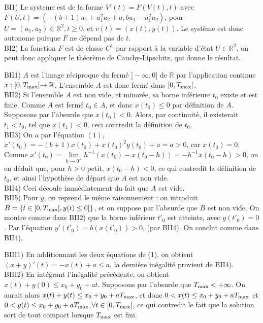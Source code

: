 \documentclass[11pt]{article}
\theoremstyle{exostyle}
\begin{document}
\noindent
BI1) Le systeme est de la forme $V'(t)=F(V(t),t)$ avec $F(U, t)=(-(b+1)u_1+u_1^2u_2+a, bu_1-u_1^2u_2)$, pour $U=(u_1, u_2)\in \mathbb R^2, t \geq 0$, et $v(t)=(x(t), y(t))$.  Le syst\`eme est donc autonome puisque $F$ ne d\'epend pas de $t$. \\
BI2) La fonction $F$ est  de classe $C^1$ par rapport \`a la variable d'\'etat $U\in \mathbb R^2$, on peut donc appliquer le th\'eor\`eme de Cauchy-Lipschitz, qui donne le r\'esultat.

\smallskip
\noindent
BII1)  $A$ est l'image r\'eciproque du ferm\'e   $]-\infty, 0]$ de $\mathbb R$ par l'application continue $x: [0, T_{\rm max}[\to \mathbb R$. L'ensemble $A$ est donc ferm\'e dans $[0, T_{\rm max}[$. \\
BII2) Si l'ensemble $A$ est non vide, et minor\'ee, sa borne inf\'erieure $t_0$ existe et est finie. Comme $A$ est ferm\'e $t_0 \in A$, et donc $x(t_0)\leq 0$ par d\'efinition de $A$. Supposons par l'absurde que $x(t_0)<0$. Alors,  par continuit\'e, il existerait $t_1<t_0$, tel que $x(t_1)<0$. ceci contredit la d\'efinition de $t_0$. \\
BII3) On  a  par l'\'equation $(1)$, $x'(t_0)=-(b+1)x(t_0)+x(t_0)^2 y(t_0)+a=a>0$, car $x(t_0)=0$.   Comme 
$x'(t_0)=\underset {h\to 0^+} \lim  h^{-1} (x(t_0)-x(t_0-h))=-h^{-1}x(t_0-h)>0$, on en d\'eduit que,  pour $h>0$ petit,  
$x(t_0-h)<0$, ce qui contredit la d\'efinition de $t_0$, et ainsi l'hypoth\`ese de d\'epart que $A$ est non  vide.\\
BII4) Ceci d\'ecoule imm\'ediatement du fait que $A$ est vide. \\
BII5) Pour $y$, on reprend le m\^eme raisonnement :  on introduit  \\
$B=\{ t \in [0, T_{\rm max}[, y(t)\leq 0[\}$, et on suppose par l'absurde que $B$ est non vide. On montre comme dans  BII2)  que la borne inf\'erieur $t'_0$ est atteinte, avec $y(t'_0)=0$. Par l'\'equation 
$y'(t'_0)=b(x(t'_0))>0$, (par BII4). On conclut  comme dans BII4). 

\smallskip
\noindent
BIII1) En additionnant les deux \'equations de (1), on obtient $(x+y)'(t)= -x(t)+a \leq a$, la derni\`ere in\'egalit\'e provient de BII4). \\
BIII2) En int\'egrant l'in\'egalit\'e pr\'ec\'edente, on obtient $x(t)+y(0)\leq x_0+y_0+ at$. Supposons par l'absurde que 
$T_{\rm max} <+\infty$. On aurait alors $x(t)+y(t) \leq x_0+y_0+a{T}_{\rm max}$, et donc
$0<x(t)\leq x_0+y_0+a{T}_{\rm max}$ et $0<y(t)\leq x_0+y_0+a{T}_{\rm max} $,$ \forall t \in [0, T_{\rm max}[$,  ce qui contredit le fait que la solution sort de tout compact lorsque  $T_{\rm max}$ est fini. 
\end{document}
